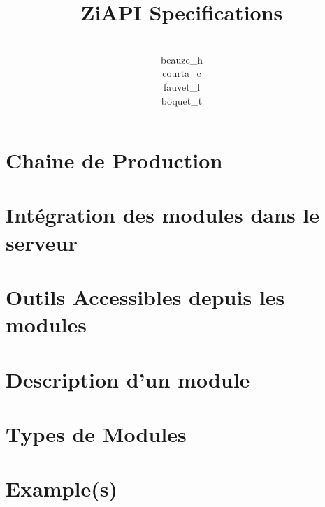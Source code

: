 \documentclass{report}
\title{ZiAPI Specifications}
\author{\\beauze\_h\\courta\_c\\fauvet\_l\\boquet\_t}
\begin{document}
  \maketitle
  \tableofcontents
  \chapter{Chaine de Production}
  
  \chapter{Intégration des modules dans le serveur}
  
  \chapter{Outils Accessibles depuis les modules}
  
  \chapter{Description d'un module}
  
  \chapter{Types de Modules}
  
  \chapter{Example(s)}
  
    
\end{document}
